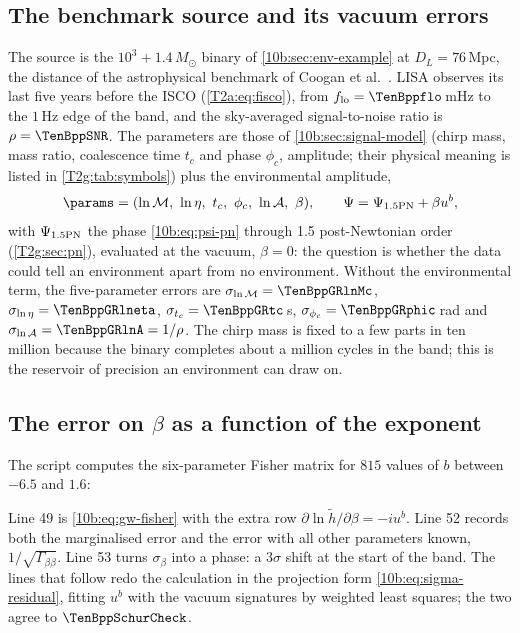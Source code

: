 \subsection{The benchmark source and its vacuum errors}
\label{10b:sec:benchmark}

The source is the $10^3+1.4\,M_\odot$ binary of \cref{10b:sec:env-example} at $D_L=76$\,Mpc, the distance of the
astrophysical benchmark of Coogan et al.\ \cite{Coogan2022}. LISA observes its last five years before the ISCO (\cref{T2a:eq:fisco}),
from $f_{\rm lo}=\TenBppflo$\,mHz to the $1$\,Hz edge of the band, and the sky-averaged signal-to-noise ratio is
$\rho=\TenBppSNR$. The parameters are those of \cref{10b:sec:signal-model} (chirp mass, mass ratio, coalescence time $t_c$ and phase
$\phi_c$, amplitude; their physical meaning is listed in \cref{T2g:tab:symbols}) plus the environmental amplitude,
\begin{equation}
  \params=(\ln\mathcal M,\ \ln\eta,\ t_c,\ \phi_c,\ \ln\mathcal A,\ \beta),\qquad
  \Psi=\Psi_{\rm 1.5PN}+\beta u^b,
  \label{10b:eq:theta6}
\end{equation}
with $\Psi_{\rm 1.5PN}$ the phase \eqref{10b:eq:psi-pn} through 1.5 post-Newtonian order (\cref{T2g:sec:pn}),
evaluated at the vacuum, $\beta=0$: the question is whether the data could tell an environment apart from no
environment. Without the environmental term, the five-parameter errors are $\sigma_{\ln\mathcal M}=\TenBppGRlnMc$,
$\sigma_{\ln\eta}=\TenBppGRlneta$, $\sigma_{t_c}=\TenBppGRtc$\,s, $\sigma_{\phi_c}=\TenBppGRphic$\,rad and
$\sigma_{\ln\mathcal A}=\TenBppGRlnA=1/\rho$. The chirp mass is fixed to a few parts in ten million because the binary
completes about a million cycles in the band; this is the reservoir of precision an environment can draw on.

\subsection{The error on \texorpdfstring{$\beta$}{beta} as a function of the exponent}
\label{10b:sec:sigma-b}

The script  computes the six-parameter Fisher matrix for $815$ values of $b$ between $-6.5$ and
$1.6$:


\noindent Line 49 is \eqref{10b:eq:gw-fisher} with the extra row $\partial\ln\tilde h/\partial\beta=-iu^b$. Line 52 records
both the marginalised error and the error with all other parameters known, $1/\sqrt{\Gamma_{\beta\beta}}$. Line 53 turns
$\sigma_\beta$ into a phase: a $3\sigma$ shift at the start of the band. The lines that follow redo the calculation in the
projection form \eqref{10b:eq:sigma-residual}, fitting $u^b$ with the vacuum signatures by weighted least squares; the
two agree to $\TenBppSchurCheck$.


